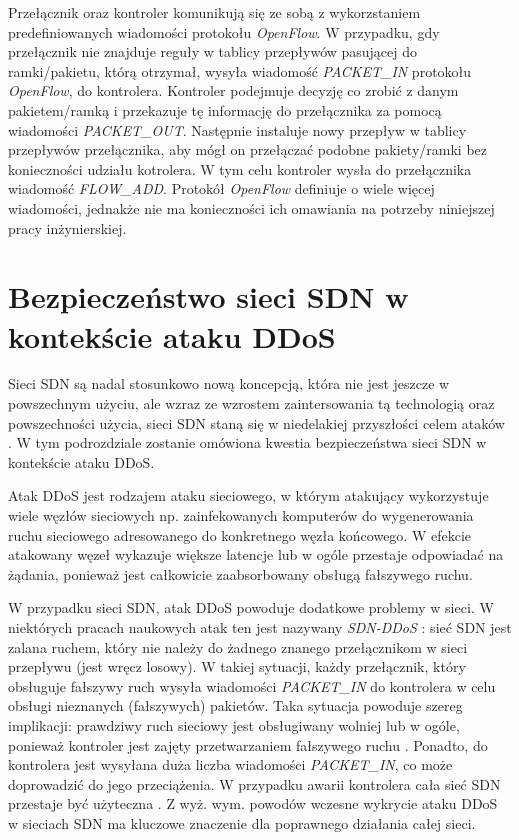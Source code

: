 Przełącznik oraz kontroler komunikują się ze sobą z wykorzstaniem
predefiniowanych wiadomości protokołu \textit{OpenFlow}. W przypadku, gdy
przełącznik nie znajduje reguły w tablicy przepływów pasującej do ramki/pakietu,
którą otrzymał, wysyła wiadomość \textit{PACKET\_IN} protokołu
\textit{OpenFlow}, do kontrolera. Kontroler podejmuje decyzję co zrobić z danym 
pakietem/ramką i przekazuje tę informację do przełącznika za pomocą wiadomości
\textit{PACKET\_OUT}. Następnie instaluje nowy przepływ w tablicy przepływów
przełącznika, aby mógł on przełączać podobne pakiety/ramki bez konieczności
udziału kotrolera. W tym celu kontroler wysła do przełącznika wiadomość
\textit{FLOW\_ADD}. Protokół \textit{OpenFlow} definiuje o wiele więcej
wiadomości, jednakże nie ma konieczności ich omawiania na potrzeby niniejszej
pracy inżynierskiej.

\section{Bezpieczeństwo sieci SDN w kontekście ataku DDoS}

Sieci SDN są nadal stosunkowo nową koncepcją, która nie jest jeszcze w
powszechnym użyciu, ale wzraz ze wzrostem zaintersowania tą technologią oraz
powszechności użycia, sieci SDN staną się w niedelakiej przyszłości celem ataków
\cite{sdnsecurityblog}. W tym podrozdziale zostanie omówiona kwestia
bezpieczeństwa sieci SDN w kontekście ataku DDoS.

Atak DDoS jest rodzajem ataku sieciowego, w którym atakujący wykorzystuje wiele
węzłów sieciowych np. zainfekowanych komputerów do wygenerowania ruchu
sieciowego adresowanego do konkretnego węzła końcowego. W efekcie atakowany
węzeł wykazuje większe latencje lub w ogóle przestaje odpowiadać na żądania,
ponieważ jest całkowicie zaabsorbowany obsługą fałszywego ruchu.

W przypadku sieci SDN, atak DDoS powoduje dodatkowe problemy w sieci. W
niektórych pracach naukowych atak ten jest nazywany \textit{SDN-DDoS}
\cite{ddosbronksarticle}: sieć SDN jest zalana ruchem, który nie należy do
żadnego znanego przełącznikom w sieci przepływu (jest wręcz losowy). W takiej
sytuacji, każdy przełącznik, który obsługuje fałszywy ruch wysyła wiadomości
\textit{PACKET\_IN} do kontrolera w celu obsługi nieznanych (fałszywych)
pakietów. Taka sytuacja powoduje szereg implikacji: prawdziwy ruch sieciowy jest
obsługiwany wolniej lub w ogóle, ponieważ kontroler jest zajęty przetwarzaniem
fałszywego ruchu \cite{indiaarticle}. Ponadto, do kontrolera jest wysyłana duża
liczba wiadomości \textit{PACKET\_IN}, co może doprowadzić do jego przeciążenia.
W przypadku awarii kontrolera cała sieć SDN przestaje być użyteczna
\cite{ddoskoreaarticle}. Z wyż. wym. powodów wczesne wykrycie ataku DDoS w
sieciach SDN ma kluczowe znaczenie dla poprawnego działania całej sieci. 


